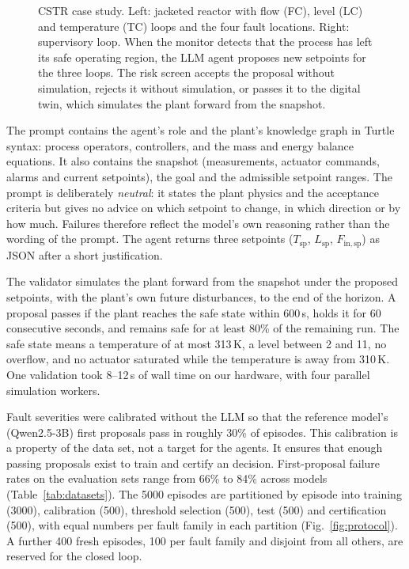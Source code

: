 \begin{figure}[!htbp]
\centering

\caption{CSTR case study. Left: jacketed reactor with flow (FC), level (LC) and temperature (TC) loops and the
four fault locations. Right: supervisory loop. When the monitor detects that the process has left its safe
operating region, the LLM agent proposes new setpoints for the three loops. The risk screen accepts the proposal
without simulation, rejects it without simulation, or passes it to the digital twin, which simulates the plant
forward from the snapshot.}
\label{fig:cstr}
\end{figure}

The prompt contains the agent's role and the plant's knowledge graph in Turtle syntax: process operators,
controllers, and the mass and energy balance equations. It also contains the snapshot (measurements, actuator
commands, alarms and current setpoints), the goal and the admissible setpoint ranges. The prompt is deliberately
\emph{neutral}: it states the plant physics and the acceptance criteria but gives no advice on which setpoint to
change, in which direction or by how much. Failures therefore reflect the model's own reasoning rather than the
wording of the prompt. The agent returns three setpoints ($T_{\mathrm{sp}}$, $L_{\mathrm{sp}}$,
$F_{\mathrm{in,sp}}$) as JSON after a short justification.

The validator simulates the plant forward from the snapshot under the proposed setpoints, with the plant's own
future disturbances, to the end of the horizon. A proposal passes if the plant reaches the safe state within
600\,s, holds it for 60 consecutive seconds, and remains safe for at least 80\% of the remaining run. The safe
state means a temperature of at most 313\,K, a level between 2 and 11, no overflow, and no actuator saturated
while the temperature is away from 310\,K. One validation took 8--12\,s of wall time on our hardware, with four
parallel simulation workers.

Fault severities were calibrated without the LLM so that the reference model's (Qwen2.5-3B) first proposals pass
in roughly 30\% of episodes. This calibration is a property of the data set, not a target for the agents. It
ensures that enough passing proposals exist to train and certify an \ACC{} decision. First-proposal failure rates
on the evaluation sets range from 66\% to 84\% across models (Table~\ref{tab:datasets}). The 5000 episodes are
partitioned by episode into training (3000), calibration (500), threshold selection (500), test (500) and
certification (500), with equal numbers per fault family in each partition (Fig.~\ref{fig:protocol}). A further
400 fresh episodes, 100 per fault family and disjoint from all others, are reserved for the closed loop.

